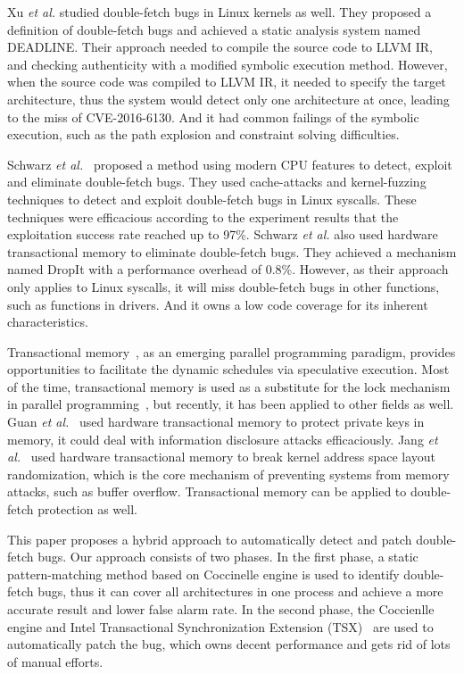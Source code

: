 \documentclass[10pt]{llncs}
\begin{document}
Xu \textit{et al.}\cite{precise} studied double-fetch bugs in Linux kernels as well. They proposed a definition of double-fetch bugs and achieved a static analysis system named DEADLINE. Their approach needed to compile the source code to LLVM IR, and checking authenticity with a modified symbolic execution method. However, when the source code was compiled to LLVM IR, it needed to specify the target architecture, thus the system would detect only one architecture at once, leading to the miss of CVE-2016-6130. And it had common failings of the symbolic execution, such as the path explosion and constraint solving difficulties.

Schwarz \textit{et al.}~\cite{modern} proposed a method using modern CPU features to detect, exploit and eliminate double-fetch bugs. They used cache-attacks and kernel-fuzzing techniques to detect and exploit double-fetch bugs in Linux syscalls. These techniques were efficacious according to the experiment results that the exploitation success rate reached up to 97\%. Schwarz \textit{et al.} also used hardware transactional memory to eliminate double-fetch bugs. They achieved a mechanism named DropIt with a performance overhead of 0.8\%. However, as their approach only applies to Linux syscalls, it will miss double-fetch bugs in other functions, such as functions in drivers. And it owns a low code coverage for its inherent characteristics.

Transactional memory~\cite{Herlihy1993Transactional,Hammond2004Transactional,Harris2010Transactional}, as an emerging parallel programming paradigm, provides opportunities to facilitate the dynamic schedules via speculative execution.
Most of the time, transactional memory is used as a substitute for the lock mechanism in parallel programming~\cite{Herlihy1993Transactional}, but recently, it has been applied to other fields as well.
Guan \textit{et al.}~\cite{Guan2015Protecting} used hardware transactional memory to protect private keys in memory, it could deal with information disclosure attacks efficaciously.
Jang \textit{et al.}~\cite{Jang2016Breaking} used hardware transactional memory to break kernel address space layout randomization, which is the core mechanism of preventing systems from memory attacks, such as buffer overflow. Transactional memory can be applied to double-fetch protection as well.

This paper proposes a hybrid approach to automatically detect and patch double-fetch bugs. Our approach consists of two phases. In the first phase, a static pattern-matching method based on Coccinelle engine is used to identify double-fetch bugs, thus it can cover all architectures in one process and achieve a more accurate result and lower false alarm rate. In the second phase, the Coccienlle engine and Intel Transactional Synchronization Extension (TSX)~\cite{Yoo2014Performance} are used to automatically patch the bug, which owns decent performance and gets rid of lots of manual efforts.
\end{document}

